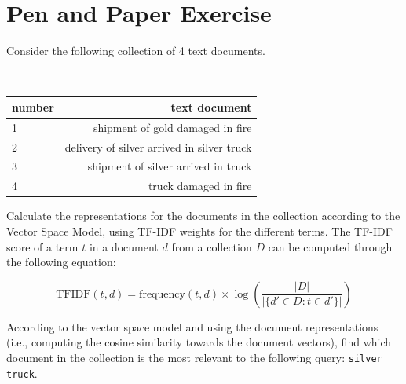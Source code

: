 \documentclass[12pt]{article}
\begin{document}
\section{Pen and Paper Exercise}

Consider the following collection of 4 text documents.

\begin{center}
\tt
\begin{tabular}{ l r }
number & text document \\
\hline
\hline
1 & shipment of gold damaged in fire \\ \hline
2 & delivery of silver arrived in silver truck \\ \hline
3 & shipment of silver arrived in truck \\ \hline
4 & truck damaged in fire \\ \hline
\end{tabular}
\end{center}

Calculate the representations for the documents in the collection according to the Vector Space Model, using TF-IDF weights for the different terms. The TF-IDF score of a term $t$ in a document $d$ from a collection $D$ can be computed through the following equation:

\begin{center}
\begin{equation*}
\mathrm{TFIDF}(t, d) = \mathrm{frequency}(t,d) \times \log \left( \frac{|D|}{|\{d' \in D: t \in d'\}|} \right)
\end{equation*}
\end{center}

According to the vector space model and using the document representations (i.e., computing the cosine similarity towards the document vectors), find which document in the collection is the most relevant to the following query: {\tt silver truck}. 
\end{document}

